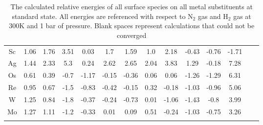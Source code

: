 \begin{table}
\begin{center}
\begin{tabular}{| c | c | c | c | c | c | c | c | c | c | c | c | c | c |}
Sc & 1.06 & 1.76 & 3.51 & 0.03 & 1.7 & 1.59 & 1.0 & 2.18 & -0.43 & -0.76 & -1.71 \\
Ag & 1.44 & 2.33 & 5.3 & 0.24 & 2.62 & 2.65 & 2.04 & 3.83 & 1.29 & -0.18 & 7.28 \\
Os & 0.61 & 0.39 & -0.7 & -1.17 & -0.15 & -0.36 & 0.06 & 0.06 & -1.26 & -1.29 & 6.31 \\
Re & 0.95 & 0.67 & -1.5 & -0.83 & -0.42 & -0.15 & 0.32 & -0.18 & -1.03 & -0.96 & 5.06 \\
W & 1.25 & 0.84 & -1.8 & -0.37 & -0.24 & -0.73 & 0.01 & -1.06 & -1.43 & -0.8 & 3.99 \\
Mo & 1.27 & 1.11 & -1.2 & -0.33 & 0.01 & 0.09 & 0.51 & -0.24 & -1.03 & -0.75 & 3.26 \\
\hline

\label{table:energies}
\end{tabular}

\end{center}
\caption{The calculated relative energies of all surface species on all metal substituents at standard state. All energies are referenced with respect to N$_2$ gas and H$_2$ gas at 300K and 1 bar of pressure. Blank spaces represent calculations that could not be converged}
\end{table}

